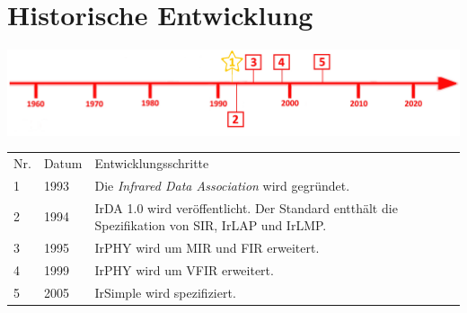 \section*{Historische Entwicklung}
\includegraphics[width=\textwidth]{Kapitel/IrDA/Grafiken/Zeitstrahl.jpg}
\par
\noindent
{}
\begin{tabular}{p{0.5 cm}p{1.5 cm}p{15.55 cm}}
	Nr. & Datum & Entwicklungsschritte\\
	1 & 1993 & Die \textit{Infrared Data Association} wird gegründet.~\cite{wikipediade}\\
	2 & 1994 & IrDA 1.0 wird veröffentlicht. Der Standard entthält die Spezifikation von SIR, IrLAP und IrLMP.~\cite{irdahistory}\\
	3 & 1995 & IrPHY wird um MIR und FIR erweitert.~\cite{irdahistory}\\
	4 & 1999 & IrPHY wird um VFIR erweitert.~\cite{irdahistory}\\
	5 & 2005 & IrSimple wird spezifiziert.~\cite{wikipediade}\\
\end{tabular}
\par
